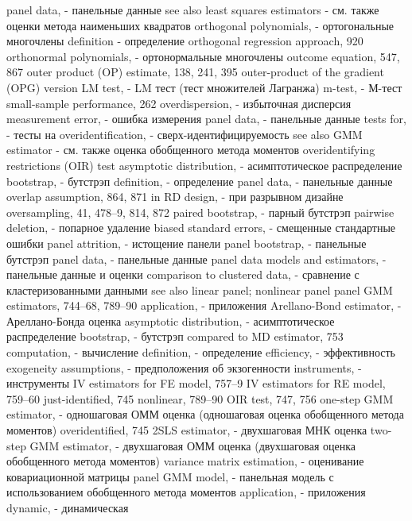 panel data, - панельные данные
see also least squares estimators - см. также оценки метода наименьших квадратов
orthogonal polynomials, - ортогональные многочлены
definition - определение
orthogonal regression approach, 920 
orthonormal polynomials, - ортонормальные многочлены 
outcome equation, 547, 867
outer product (OP) estimate, 138, 241, 395 outer-product of the gradient (OPG) version
LM test, - LM тест (тест множителей Лагранжа)
m-test, - М-тест
small-sample performance, 262
overdispersion, - избыточная дисперсия 
measurement error, - ошибка измерения 
panel data, - панельные данные
tests for, - тесты на
overidentification, - сверх-идентифицируемость 
see also GMM estimator - см. также оценка обобщенного метода моментов
overidentifying restrictions (OIR) test 
asymptotic distribution, - асимптотическое распределение 
bootstrap, - бутстрэп
definition, - определение
panel data, - панельные данные
overlap assumption, 864, 871
in RD design, - при разрывном дизайне
oversampling, 41, 478–9, 814, 872
paired bootstrap, - парный бутстрэп
pairwise deletion, - попарное удаление
biased standard errors, - смещенные стандартные ошибки
panel attrition, - истощение панели
panel bootstrap, - панельные бутстрэп 
panel data, - панельные данные
panel data models and estimators, - панельные данные и оценки
comparison to clustered data, - сравнение с кластеризованными данными 
see also linear panel; nonlinear panel panel GMM estimators, 744–68, 789–90
application, - приложения
Arellano-Bond estimator, - Ареллано-Бонда оценка
asymptotic distribution, - асимптотическое распределение
bootstrap, - бутстрэп
compared to MD estimator, 753 
computation, - вычисление
definition, - определение
efficiency, - эффективность
exogeneity assumptions, - предположения об экзогенности
instruments, - инструменты
IV estimators for FE model, 757–9 IV estimators for RE model, 759–60 just-identified, 745
nonlinear, 789–90
OIR test, 747, 756
one-step GMM estimator, - одношаговая ОММ оценка (одношаговая оценка обобщенного метода моментов)
overidentified, 745
2SLS estimator, - двухшаговая МНК оценка
two-step GMM estimator, - двухшаговая ОММ оценка (двухшаговая оценка обобщенного метода моментов)
variance matrix estimation, - оценивание ковариационной матрицы
panel GMM model, - панельная модель с использованием обобщенного метода моментов
application, - приложения
dynamic, - динамическая

